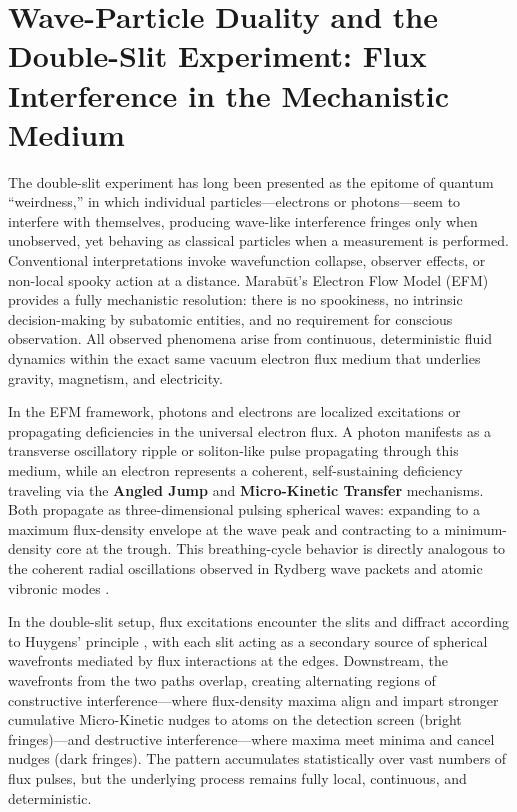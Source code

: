 \documentclass[11pt, a4paper]{article}
\begin{document}
\section{Wave-Particle Duality and the Double-Slit Experiment: Flux Interference in the Mechanistic Medium}

The double-slit experiment has long been presented as the epitome of quantum ``weirdness,'' in which individual particles—electrons or photons—seem to interfere with themselves, producing wave-like interference fringes only when unobserved, yet behaving as classical particles when a measurement is performed. Conventional interpretations invoke wavefunction collapse, observer effects, or non-local spooky action at a distance. Marab\={u}t's Electron Flow Model (EFM) provides a fully mechanistic resolution: there is no spookiness, no intrinsic decision-making by subatomic entities, and no requirement for conscious observation. All observed phenomena arise from continuous, deterministic fluid dynamics within the exact same vacuum electron flux medium that underlies gravity, magnetism, and electricity.

In the EFM framework, photons and electrons are localized excitations or propagating deficiencies in the universal electron flux. A photon manifests as a transverse oscillatory ripple or soliton-like pulse propagating through this medium, while an electron represents a coherent, self-sustaining deficiency traveling via the \textbf{Angled Jump} and \textbf{Micro-Kinetic Transfer} mechanisms. Both propagate as three-dimensional pulsing spherical waves: expanding to a maximum flux-density envelope at the wave peak and contracting to a minimum-density core at the trough. This breathing-cycle behavior is directly analogous to the coherent radial oscillations observed in Rydberg wave packets and atomic vibronic modes \cite{chen1999}.

In the double-slit setup, flux excitations encounter the slits and diffract according to Huygens' principle \cite{huygens1690}, with each slit acting as a secondary source of spherical wavefronts mediated by flux interactions at the edges. Downstream, the wavefronts from the two paths overlap, creating alternating regions of constructive interference—where flux-density maxima align and impart stronger cumulative Micro-Kinetic nudges to atoms on the detection screen (bright fringes)—and destructive interference—where maxima meet minima and cancel nudges (dark fringes). The pattern accumulates statistically over vast numbers of flux pulses, but the underlying process remains fully local, continuous, and deterministic.
\end{document}
